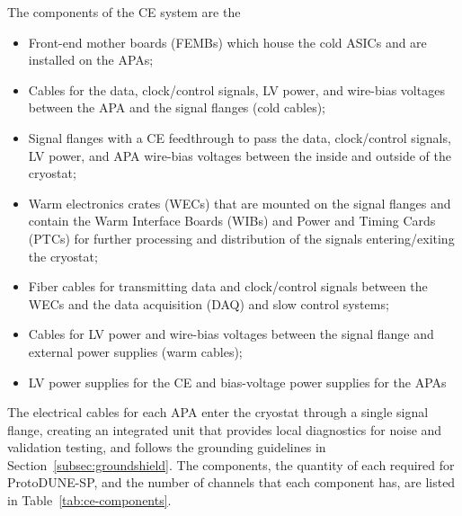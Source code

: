 The components of the CE system are the
\begin{itemize}
\item Front-end mother boards (FEMBs) which house the cold ASICs and are installed on the APAs;
\item Cables for the data, clock/control signals, LV power, and wire-bias voltages 
between the APA and the signal flanges (cold cables);
\item Signal flanges with a CE feedthrough to pass the data, clock/control signals, 
LV power, and APA wire-bias voltages between the inside and outside of the cryostat;
\item Warm electronics crates (WECs) that are mounted on the signal flanges and contain the Warm Interface Boards (WIBs)
and Power and Timing Cards (PTCs) for further processing and distribution of the signals entering/exiting the cryostat;
\item Fiber cables for transmitting data and clock/control signals between the WECs and the data acquisition 
(DAQ) and slow control systems;
\item Cables for LV power and wire-bias voltages between the signal flange and external power supplies (warm cables);
\item LV power supplies for the CE and bias-voltage power supplies for the APAs
\end{itemize}

The electrical cables for each APA enter the cryostat through a single 
signal flange, creating an integrated unit that provides local diagnostics for noise and validation testing,
and follows the grounding guidelines in Section~\ref{subsec:groundshield}. The components, the quantity of each required for ProtoDUNE-SP, and the number of channels that each component has, are listed in Table~\ref{tab:ce-components}.

